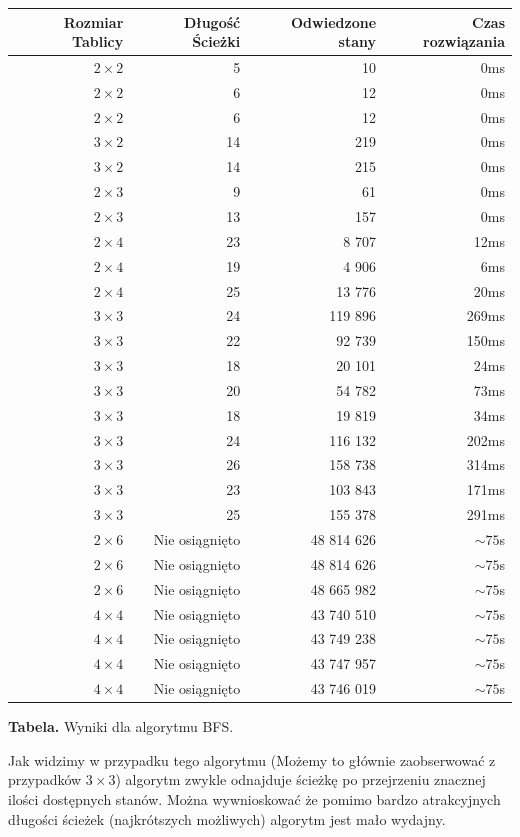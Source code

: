 \documentclass{classrep}
\begin{document}
\begin{center}
\begin{longtable}{|r|r|r|r|}
  \hline 
  Rozmiar Tablicy & Długość Ścieżki & Odwiedzone stany & Czas rozwiązania \\
  	\hline
		$2 \times 2$ & 5 & 10 & 0ms \\
	\hline
		$2 \times 2$ & 6 & 12 & 0ms \\
	\hline
		$2 \times 2$ & 6 & 12 & 0ms \\
	\hline
		$3 \times 2$ & 14 & 219 & 0ms \\
	\hline
		$3 \times 2$ & 14 & 215 & 0ms \\
	\hline
		$2 \times 3$ & 9 & 61 & 0ms \\
	\hline
		$2 \times 3$ & 13 & 157 & 0ms \\
	\hline
		$2 \times 4$ & 23 & 8 707 & 12ms \\
	\hline
		$2 \times 4$ & 19 & 4 906 & 6ms \\
	\hline
		$2 \times 4$ & 25 & 13 776 & 20ms \\
	\hline
		$3 \times 3$ & 24 & 119 896 & 269ms \\
	\hline
		$3 \times 3$ & 22 & 92 739 & 150ms \\
	\hline
		$3 \times 3$ & 18 & 20 101 & 24ms \\
	\hline
		$3 \times 3$ & 20 & 54 782 & 73ms \\
	\hline
		$3 \times 3$ & 18 & 19 819 & 34ms \\
	\hline
		$3 \times 3$ & 24 & 116 132 & 202ms \\
	\hline
		$3 \times 3$ & 26 & 158 738 & 314ms \\
	\hline
		$3 \times 3$ & 23 & 103 843 & 171ms \\
	\hline
		$3 \times 3$ & 25 & 155 378 & 291ms \\
	\hline
		$2 \times 6$ & Nie osiągnięto & 48 814 626 & $\sim 75$s \\
	\hline
		$2 \times 6$ & Nie osiągnięto & 48 814 626 & $\sim 75$s \\
	\hline
		$2 \times 6$ & Nie osiągnięto & 48 665 982 & $\sim 75$s \\
	\hline
		$4 \times 4$ & Nie osiągnięto & 43 740 510 & $\sim 75$s \\
	\hline
		$4 \times 4$ & Nie osiągnięto & 43 749 238 & $\sim 75$s \\
	\hline
		$4 \times 4$ & Nie osiągnięto & 43 747 957 & $\sim 75$s \\
	\hline
		$4 \times 4$ & Nie osiągnięto & 43 746 019 & $\sim 75$s \\

	\hline
\end{longtable} 
\textbf{Tabela.} Wyniki dla algorytmu BFS.
\end{center}
Jak widzimy w przypadku tego algorytmu (Możemy to głównie zaobserwować z przypadków $3 \times 3$) algorytm zwykle odnajduje ścieżkę po przejrzeniu znacznej ilości dostępnych stanów. Można wywnioskować że pomimo bardzo atrakcyjnych długości ścieżek (najkrótszych możliwych) algorytm jest mało wydajny.
 
\end{document}
